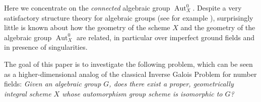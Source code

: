 \documentclass[oneside, 12pt]{amsart}
\theoremstyle{definition}
\theoremstyle{remark}
\newcommand{\CC}{\mathbb{C}}
\newcommand{\PP}{\mathbb{P}}
\newcommand{\Aut}{\operatorname{Aut}}
\renewcommand{\O}{\mathscr{O}}
\newcommand{\ra}{\rightarrow}
\begin{document}
Here we concentrate on the \emph{connected} algebraic group $\Aut_X^0$. 
Despite a very satisfactory structure theory for algebraic groups 
(see for example \cite{Milne 2017}),  surprisingly little is known about how the geometry 
of the scheme $X$ and the  geometry of the algebraic group $\Aut_X^0$ are related, 
in particular over imperfect ground fields and in presence of singularities.

% 
% 

The goal of this paper is to investigate the following problem, 
which can be seen as a higher-dimensional analog 
of the classical Inverse Galois Problem for number fields:
\emph{Given an algebraic group $G$, does there exist a proper, 
geometrically integral scheme $X$ whose automorphism group scheme 
is isomorphic to $G$?} 
 
\end{document}
